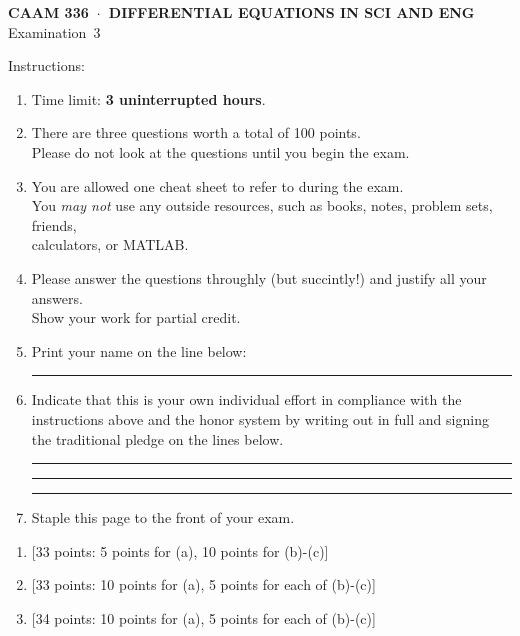 \documentclass[11pt]{article}
\begin{document}
\thispagestyle{empty}
\vspace*{0em}
   \begin{center}
      \textsf{\textbf{CAAM 336\ $\cdot$\ DIFFERENTIAL EQUATIONS IN SCI AND ENG}}\\[0.5em]
       \textsf{Examination~3}
   \end{center}
   
\vspace*{3em}
Instructions:
\begin{enumerate}
\item Time limit: \textbf{3 uninterrupted hours}.
\item There are three questions worth a total of 100 points.\\
      Please do not look at the questions until you begin the exam.
\item You are allowed one cheat sheet to refer to during the exam. \\
You \emph{may not} use any outside resources, such as books, notes, problem sets, friends,\\
      calculators, or MATLAB. 
\item Please answer the questions throughly (but succintly!) and justify all your answers.\\
      Show your work for partial credit.

\item Print your name on the line below:

\vspace*{1em}\rule{6in}{0.5pt}

\item Indicate that this is your own individual effort in compliance with 
      the instructions above and the honor system by writing out in full 
      and signing the traditional pledge on the lines below.

\vspace*{1em}\rule{6in}{0.5pt}

\vspace*{1em}\rule{6in}{0.5pt}

\vspace*{1em}\rule{6in}{0.5pt}

\item Staple this page to the front of your exam.

\end{enumerate}

\newpage
\setcounter{page}{1}
\begin{enumerate}


\item {[33 points: 5 points for (a), 10 points for (b)-(c)]} 

\newpage
\item {[33 points: 10 points for (a), 5 points for each of (b)-(c)]} 
\newpage

\item {[34 points: 10 points for (a), 5 points for each of (b)-(c)]} 


\end{enumerate}
\end{document}
